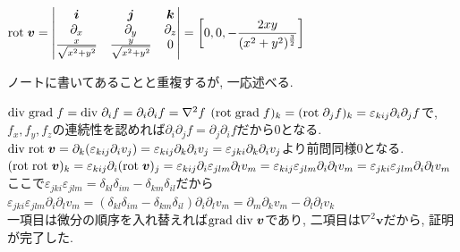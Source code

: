 \documentclass[a4j,dvipdfmx]{jsarticle}
\renewcommand{\div}{{\rm div}\hspace{1mm}}
\newcommand{\grad}{{\rm grad}\hspace{1mm}}
\newcommand{\rot}{{\rm rot}\hspace{1mm}}
\begin{document}
\begin{qparts}
\begin{qlist}
                $\displaystyle
                    \rot \bm{v}=\begin{vmatrix}
                        \bm{i} & \bm{j} & \bm{k} \\
                        \partial_x & \partial_y & \partial_z \\
                        \frac{x}{\sqrt{x^2+y^2}} & \frac{y}{\sqrt{x^2+y^2}} & 0
                    \end{vmatrix}=\left[0,0,-\frac{2xy}{(x^2+y^2)^{\frac{3}{2}}}\right]
                $
            \end{qlist}
            \qpart ノートに書いてあることと重複するが, 一応述べる.
            \begin{qlist}
                \qitem $\div \grad f = \div\partial_i f=\partial_i \partial_i f=\nabla^2 f$
                \qitem $(\rot \grad f)_k = (\rot\partial_jf)_k=\varepsilon_{kij}\partial_i\partial_j f$で, $f_x,f_y,f_z$の連続性を認めれば$\partial_i\partial_j f=\partial_j\partial_i f$だから$0$となる.
                \qitem $\div \rot\bm{v}=\partial_k (\varepsilon_{kij}\partial_iv_j)=\varepsilon_{kij}\partial_k\partial_iv_j=\varepsilon_{jki}\partial_k\partial_iv_j$より前問同様$0$となる.
                \qitem $(\rot \rot\bm{v})_k=\varepsilon_{kij}\partial_i(\rot\bm{v})_j=\varepsilon_{kij}\partial_i\varepsilon_{jlm}\partial_lv_m=\varepsilon_{kij}\varepsilon_{jlm}\partial_i\partial_lv_m=\varepsilon_{jki}\varepsilon_{jlm}\partial_i\partial_lv_m$\\
                ここで$\varepsilon_{jki}\varepsilon_{jlm}=\delta_{kl}\delta_{im}-\delta_{km}\delta_{il}$だから$\varepsilon_{jki}\varepsilon_{jlm}\partial_i\partial_lv_m=(\delta_{kl}\delta_{im}-\delta_{km}\delta_{il})\partial_i\partial_lv_m=\partial_m\partial_kv_m-\partial_l\partial_lv_k$\\
                一項目は微分の順序を入れ替えれば$\grad\div\bm{v}$であり, 二項目は$\nabla^2\bm{v}$だから, 証明が完了した. 
            \end{qlist}
        \end{qparts}
    \clearpage
\end{document}
